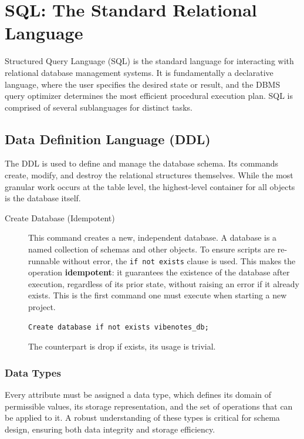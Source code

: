 \section{SQL: The Standard Relational Language}
Structured Query Language (SQL) is the standard language for interacting with relational database management systems. It is fundamentally a declarative language, where the user specifies the desired state or result, and the DBMS query optimizer determines the most efficient procedural execution plan. SQL is comprised of several sublanguages for distinct tasks.

\subsection{Data Definition Language (DDL)}
The DDL is used to define and manage the database schema. Its commands create, modify, and destroy the relational structures themselves. While the most granular work occurs at the table level, the highest-level container for all objects is the database itself.

\begin{description}
    \item[Create Database (Idempotent)] This command creates a new, independent database. A database is a named collection of schemas and other objects. To ensure scripts are re-runnable without error, the \texttt{if not exists} clause is used. This makes the operation \textbf{idempotent}: it guarantees the existence of the database after execution, regardless of its prior state, without raising an error if it already exists. This is the first command one must execute when starting a new project.
    \begin{verbatim}
Create database if not exists vibenotes_db;
    \end{verbatim}
    The counterpart is drop if exists, its usage is trivial.
\end{description}


\subsubsection{Data Types}
Every attribute must be assigned a data type, which defines its domain of permissible values, its storage representation, and the set of operations that can be applied to it. A robust understanding of these types is critical for schema design, ensuring both data integrity and storage efficiency.

